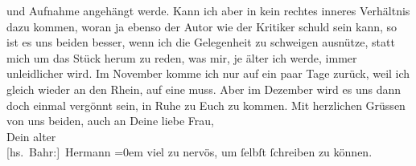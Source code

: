 \begin{ledgroupsized}[t]{13cm}
               und Aufnahme angehängt werde. Kann ich aber in kein rechtes inneres Verhältnis dazu
               kommen, woran ja ebenso der Autor wie der Kritiker schuld sein kann, so ist es uns
               beiden besser, wenn ich die Gelegenheit zu schweigen ausnütze, statt mich um das
               Stück herum zu reden, was mir, je älter ich werde, immer unleidlicher wird.\pend
           \pstart
           Im November komme ich nur auf ein paar Tage zurück, weil ich gleich
               wieder an den Rhein, auf eine \label{K_L01958_3v}\label{K_L01958_3h} muss. Aber im
                  Dezember wird es uns dann doch einmal vergönnt sein, in Ruhe zu Euch zu kommen.\pend
           \pstart
           {\pb}Mit herzlichen Grüssen von uns beiden, auch an Deine liebe Frau,{\\[\baselineskip]}Dein alter{\\[\baselineskip]}\spacefill\mbox{{[}hs. Bahr:{]} Hermann}\pend
           \leftskip=0em{}\pstart
           \noindent{}viel zu nervös, um ſelbſt ſchreiben zu können.\pend
           
         
         \endnumbering{}\end{ledgroupsized}  \newcommand{\dateiname}{L01958}\newcommand{\titel}{Hermann Bahr an Arthur Schnitzler, 26. 9. 1910}\newcommand{\editorInnen}{ Kurt Ifkovits,  Martin Anton Müller}
      
